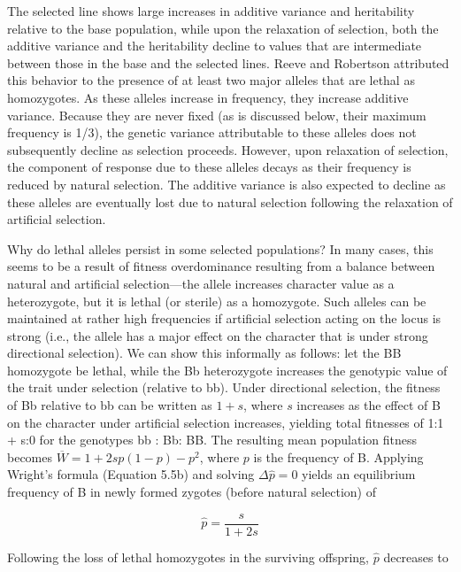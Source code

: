 \documentclass{article}
\begin{document}
The selected line shows large increases in additive variance and heritability relative to the base population, while upon the relaxation of selection, both the additive variance and the heritability decline to values that are intermediate between those in the base and the selected lines. Reeve and Robertson attributed this behavior to the presence of at least two major alleles that are lethal as homozygotes. As these alleles increase in frequency, they increase additive variance. Because they are never fixed (as is discussed below, their maximum frequency is 1/3), the genetic variance attributable to these alleles does not subsequently decline as selection proceeds. However, upon relaxation of selection, the component of response due to these alleles decays as their frequency is reduced by natural selection. The additive variance is also expected to decline as these alleles are eventually lost due to natural selection following the relaxation of artificial selection.

Why do lethal alleles persist in some selected populations? In many cases, this seems to be a result of fitness overdominance resulting from a balance between natural and artificial selection—the allele increases character value as a heterozygote, but it is lethal (or sterile) as a homozygote. Such alleles can be maintained at rather high frequencies if artificial selection acting on the locus is strong (i.e., the allele has a major effect on the character that is under strong directional selection). We can show this informally as follows: let the BB homozygote be lethal, while the Bb heterozygote increases the genotypic value of the trait under selection (relative to bb). Under directional selection, the fitness of Bb relative to bb can be written as  $ 1 + s $, where  $ s $ increases as the effect of B on the character under artificial selection increases, yielding total fitnesses of 1:1 + s:0 for the genotypes bb : Bb: BB. The resulting mean population fitness becomes  $ \overline{W} = 1 + 2sp(1 - p) - p^2 $, where  $ p $ is the frequency of B. Applying Wright's formula (Equation 5.5b) and solving  $ \Delta\hat{p} = 0 $ yields an equilibrium frequency of B in newly formed zygotes (before natural selection) of

\begin{equation}
\widehat{p}=\frac{s}{1+2s}
\tag{25.12a}
\label{eq:25_12a}
\end{equation}

Following the loss of lethal homozygotes in the surviving offspring,  $ \hat{p} $ decreases to
\end{document}
